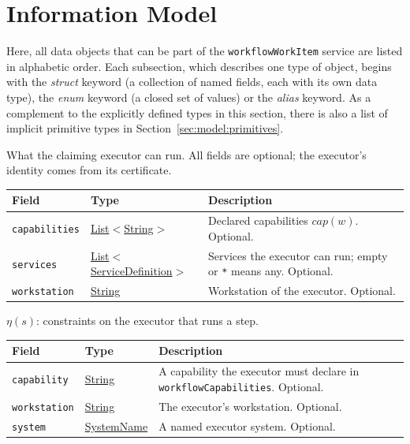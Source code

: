 \documentclass[a4paper]{arrowhead}
\newcommand{\pref}[1]{{\textcolor{ArrowheadGrey}{\hyperref[sec:model:primitives:#1]{#1}}}}
\begin{document}
\newpage
\section{Information Model}
\label{sec:model}
Here, all data objects that can be part of the \texttt{workflowWorkItem} service are listed in alphabetic order. Each
subsection, which describes one type of object, begins with the \textit{struct} keyword (a collection of named fields,
each with its own data type), the \textit{enum} keyword (a closed set of values) or the \textit{alias} keyword. As a
complement to the explicitly defined types in this section, there is also a list of implicit primitive types in
Section~\ref{sec:model:primitives}.

What the claiming executor can run. All fields are optional; the executor's identity comes from its certificate.

{\small
\begin{longtable}{|p{3.9cm}|p{4.4cm}|p{7.5cm}|}

\hline
\rowcolor{gray!33} Field & Type & Description \\ \hline
\endhead
\texttt{capabilities} & \pref{List}$<$\pref{String}$>$ & Declared capabilities $cap(w)$. Optional. \\ \hline
\texttt{services} & \pref{List}$<$\pref{ServiceDefinition}$>$ & Services the executor can run; empty or \texttt{*} means any. Optional. \\ \hline
\texttt{workstation} & \pref{String} & Workstation of the executor. Optional. \\ \hline
\end{longtable}
}

$\eta(s)$: constraints on the executor that runs a step.

{\small
\begin{longtable}{|p{3.9cm}|p{4.4cm}|p{7.5cm}|}

\hline
\rowcolor{gray!33} Field & Type & Description \\ \hline
\endhead
\texttt{capability} & \pref{String} & A capability the executor must declare in \texttt{workflowCapabilities}. Optional. \\ \hline
\texttt{workstation} & \pref{String} & The executor's workstation. Optional. \\ \hline
\texttt{system} & \pref{SystemName} & A named executor system. Optional. \\ \hline
\end{longtable}
}
\end{document}
